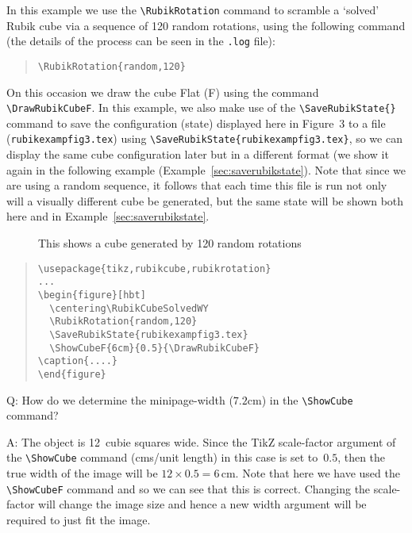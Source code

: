 \documentclass[a4paper]{article}
\begin{document}
In this example we use the \verb!\RubikRotation! command to scramble a `solved' 
Rubik cube via  a sequence of 120 random rotations, using the following  command 
(the details of the process can be seen in the \texttt{.log} file):
\begin{quote}
\begin{verbatim}
\RubikRotation{random,120}
\end{verbatim}
\end{quote}
On this occasion we draw the cube Flat (F) using the command \verb!\DrawRubikCubeF!.
In this example, we also make use of the \verb!\SaveRubikState{}! command to  save 
the  configuration (state) displayed here in Figure~3 to a file 
(\texttt{rubikexampfig3.tex}) using \verb!\SaveRubikState{rubikexampfig3.tex}!,
so we can  display the  same cube configuration later  but in  a different format
(we show it again in the following example (Example~\ref{sec:saverubikstate}).
Note that since we are using a random sequence, it follows that each 
time this file is run not only will a visually different  cube  be generated,  
but the same state  will be shown  both 
here and in Example~\ref{sec:saverubikstate}.
\begin{figure}[hbt]
  \centering
  \RubikCubeSolvedWY
\parbox{0.7\textwidth}{%
\caption{\label{fig:randomone}This shows a cube  generated by 120 random rotations}}
\end{figure}
\begin{quote}
\begin{verbatim}
\usepackage{tikz,rubikcube,rubikrotation}
...
\begin{figure}[hbt]
  \centering\RubikCubeSolvedWY
  \RubikRotation{random,120}
  \SaveRubikState{rubikexampfig3.tex}  
  \ShowCubeF{6cm}{0.5}{\DrawRubikCubeF}
\caption{....}
\end{figure}
\end{verbatim}
\end{quote}

{\noindent}Q: How do we determine the minipage-width ($7.2$cm) in the 
\verb!\ShowCube! command?

\smallskip

{\noindent}A: The object is 12~cubie squares  wide. Since the TikZ scale-factor 
argument of the  \verb!\ShowCube! command (cms/unit length) in this 
case is set to~$0.5$, then the true width of  the image will 
be $12 \times 0.5 = 6$\,cm. Note that here we have used the \verb!\ShowCubeF!
command and so we can see that this is correct. Changing the scale-factor will 
change the image size and hence a new width argument will be required to just fit 
the image.  
\end{document}
